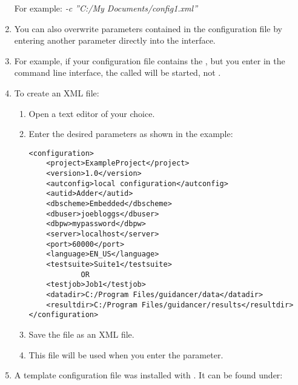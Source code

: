 \begin{enumerate}
For example:
\emph{-c ''C:/My Documents/config1.xml''}
\item You can also overwrite parameters contained in the configuration file by entering another parameter directly into the interface. 
\item For example, if your configuration file contains the \gdsuite{} , but you enter  in the command line interface, the \gdsuite{} called  will be started, not .
\item To create an XML file:
\begin{enumerate} 
\item Open a text editor of your choice. 
\item Enter the desired parameters as shown in the example:
\footnotesize
\begin{verbatim}
<configuration>
    <project>ExampleProject</project>
    <version>1.0</version>
    <autconfig>local configuration</autconfig>
    <autid>Adder</autid>
    <dbscheme>Embedded</dbscheme>
    <dbuser>joebloggs</dbuser>
    <dbpw>mypassword</dbpw>
    <server>localhost</server>
    <port>60000</port>
    <language>EN_US</language>
    <testsuite>Suite1</testsuite>
            OR
    <testjob>Job1</testjob>        
    <datadir>C:/Program Files/guidancer/data</datadir>
    <resultdir>C:/Program Files/guidancer/results</resultdir>
</configuration>
\end{verbatim}
\normalsize
\item Save the file as an XML file.
\item This file will be used when you enter the  parameter.
\end{enumerate}
\item A template configuration file was installed with \app{}. It can be found under:\\
\end{enumerate}
